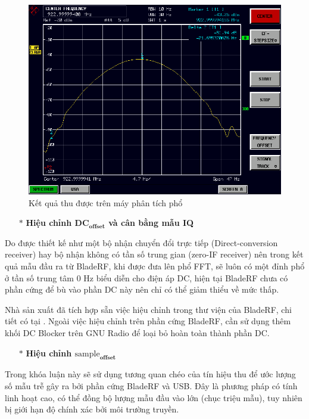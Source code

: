 
\begin{figure} [!ht]
	\centering
	\includegraphics[width=0.85\linewidth]{figures/freqanly.png}
	\caption{Kết quả thu được trên máy phân tích phổ}
	\label{fig:freqanly}
\end{figure}

\begin{itemize}
	\item[$\ast$] \textbf{Hiệu chỉnh $\textbf{DC}_{\textbf{offset}}$ và cân bằng  mẫu IQ}
\end{itemize}

 Do được thiết kế như một bộ nhận chuyển đổi trực tiếp (Direct-conversion receiver) hay bộ nhận không có tần số trung gian (zero-IF receiver) nên trong kết quả mẫu đầu ra từ BladeRF, khi được đưa lên phổ FFT, sẽ luôn có một đỉnh phổ ở tần số trung tâm 0 Hz biểu diễn cho điện áp DC, hiện tại BladeRF chưa có phần cứng để bù vào phần DC này nên chỉ có thể giảm thiểu về mức thấp.

Nhà sản xuất đã tích hợp sẵn việc hiệu chỉnh trong thư viện của BladeRF, chi tiết có tại \cite{Dccali}. Ngoài việc hiệu chỉnh trên phần cứng BladeRF, cần sử dụng thêm khối DC Blocker trên GNU Radio để loại bỏ hoàn toàn thành phần DC.

\begin{itemize}
	\item[$\ast$] \textbf{Hiệu chỉnh $\textrm{sample}_{\textbf{offset}}$}
\end{itemize} 

Trong khóa luận này sẽ sử dụng tương quan chéo của tín hiệu thu để ước lượng số mẫu trễ gây ra bởi phần cứng BladeRF và USB. Đây là phương pháp có tính linh hoạt cao, có thể đồng bộ lượng mẫu đầu vào lớn (chục triệu mẫu), tuy nhiên bị giới hạn độ chính xác bởi môi trường truyền.

